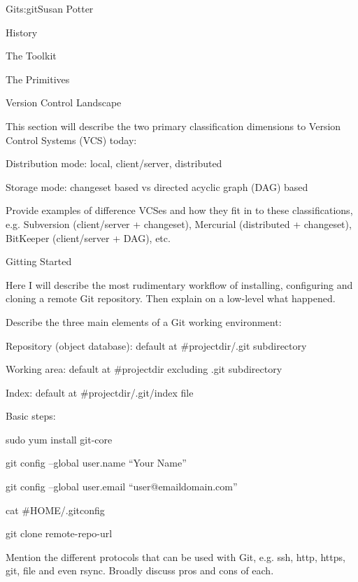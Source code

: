 \begin{aosachapter}{Git}{s:git}{Susan Potter}
\begin{aosasect1}{History}
\begin{aosasect1}{The Toolkit}
\begin{aosasect1}{The Primitives}
\begin{aosasect1}{Version Control Landscape}

This section will describe the two primary classification dimensions to
Version Control Systems (VCS) today:

\begin{aosaitemize}
  \item Distribution mode: local, client/server, distributed
  \item Storage mode: changeset based vs directed acyclic graph (DAG) based
\end{aosaitemize}

Provide examples of difference VCSes and how they fit in to these
classifications, e.g. Subversion (client/server + changeset), Mercurial
(distributed + changeset), BitKeeper (client/server + DAG), etc.

\end{aosasect1}

\begin{aosasect1}{Gitting Started}

Here I will describe the most rudimentary workflow of installing, configuring
and cloning a remote Git repository. Then explain on a low-level what happened.

Describe the three main elements of a Git working environment:
\begin{aosaitemize}
  \item Repository (object database): default at #{projectdir}/.git subdirectory
  \item Working area: default at #{projectdir} excluding .git subdirectory
  \item Index: default at #{projectdir}/.git/index file
\end{aosaitemize}

Basic steps:
\begin{aosaitemize}
  \item sudo yum install git-core
  \item git config --global user.name ``Your Name''
  \item git config --global user.email ``user@emaildomain.com''
  \item cat #{HOME}/.gitconfig
  \item git clone remote-repo-url
\end{aosaitemize}

Mention the different protocols that can be used with Git, e.g. ssh, http,
https, git, file and even rsync. Broadly discuss pros and cons of each.


\end{aosasect1}
\end{aosasect1}
\end{aosasect1}
\end{aosasect1}
\end{aosachapter}
